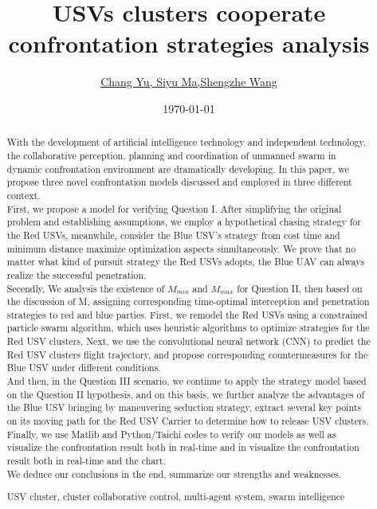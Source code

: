 \documentclass{mcmthesis}
\title{  USVs clusters cooperate confrontation strategies analysis}
\author{\small \href{http://www.latexstudio.net/}
  {Chang Yu, \space \space \space \space \space  Siyu Ma,\space  \space  \space  \space  \space Shengzhe Wang}}
\date{\today}
\begin{document}
\begin{abstract}
With the development of artificial intelligence technology and independent technology, the collaborative perception, planning and coordination of unmanned swarm in dynamic confrontation environment are dramatically developing. In this paper, we propose three novel confrontation models discussed and employed in three different context. \\
First, we propose a model for verifying Question I. After simplifying the original problem and establishing assumptions, we employ a hypothetical chasing strategy for the Red USVs, meanwhile, consider the Blue USV's strategy from cost time and minimum distance maximize optimization aspects simultaneously. We prove that no matter what kind of pursuit strategy the Red USVs adopts, the Blue UAV can always realize the successful penetration. \\
Secendly, We analysis the existence of $M_{min}$ and $M_{max}$ for Question II, then based on the discussion of M, assigning corresponding time-optimal interception and penetration strategies to red and blue parties. First, we remodel the Red USVs using a constrained particle swarm algorithm, which uses heuristic algorithms to optimize strategies for the Red USV clusters. Next, we use the convolutional neural network (CNN) to predict the Red USV clusters flight trajectory, and propose corresponding countermeasures for the Blue USV under different conditions. \\
And then, in the Question III scenario, we continue to apply the strategy model based on the Question II hypothesis, and on this basis, we further analyze the advantages of the Blue USV bringing by maneuvering seduction strategy, extract several key points on its moving path for the Red USV Carrier to determine how to release USV clusters. \\
Finally, we use Matlib and Python/Taichi codes to verify our models as well as visualize the confrontation result both in real-time and in visualize the confrontation result both in real-time and the chart. \\
We deduce our conclusions in the end, summarize our strengths and weaknesses.
\begin{keywords}
USV cluster, cluster collaborative control, multi-agent system, swarm intelligence
\end{keywords}
\end{abstract}
\maketitle
\tableofcontents
\newpage
\end{document}
